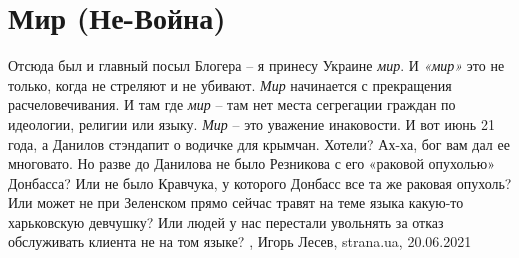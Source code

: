  
 
 
 
 
\chapter{Мир (Не-Война)}
\label{sec:slova.mir.peace}

Отсюда был и главный посыл Блогера – я принесу Украине \emph{мир}. И \emph{«мир»} это не
только, когда не стреляют и не убивают. \emph{Мир} начинается с прекращения
расчеловечивания. И там где \emph{мир} – там нет места сегрегации граждан по
идеологии, религии или языку. \emph{Мир} – это уважение инаковости.  И вот июнь 21
года, а Данилов стэндапит о водичке для крымчан. Хотели? Ах-ха, бог вам дал ее
многовато. Но разве до Данилова не было Резникова с его «раковой опухолью»
Донбасса? Или не было Кравчука, у которого Донбасс все та же раковая опухоль?
Или может не при Зеленском прямо сейчас травят на теме языка какую-то
харьковскую девчушку? Или людей у нас перестали увольнять за отказ обслуживать
клиента не на том языке?
, 
Игорь Лесев, strana.ua, 20.06.2021

